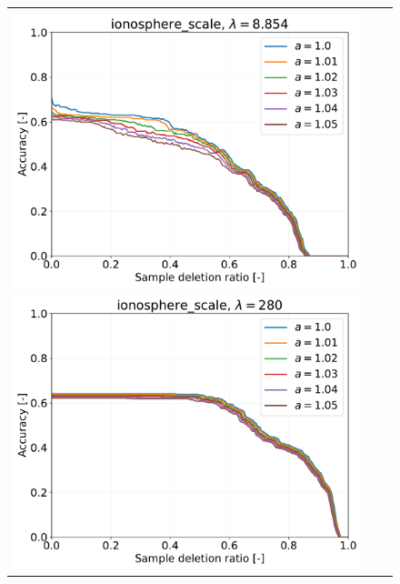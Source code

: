 \begin{figure}[H]
\begin{tabular}{ccc}
		\begin{minipage}[b]{0.3\hsize}\centering {\small Dataset: ionosphere, $\lambda=n \cdot 10^{-1.5}$}\\\includegraphics[width=0.8\hsize]{fig/table_logistic/ionosphere_scale-logistic/kernel/kernel_ss_screening_rate_lam8.854_x_n_y_etest.pdf}\end{minipage}
		&
		\begin{minipage}[b]{0.3\hsize}\centering {\small Dataset: ionosphere, $\lambda=n$}\\\includegraphics[width=0.8\hsize]{fig/table_logistic/ionosphere_scale-logistic/kernel/kernel_ss_screening_rate_lam280_x_n_y_etest.pdf}\end{minipage}
		\\

\end{tabular}
\end{figure}

